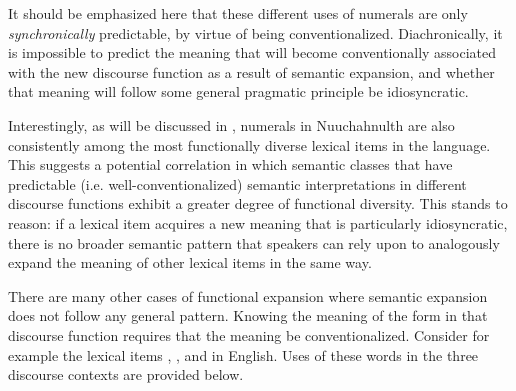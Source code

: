 It should be emphasized here that these different uses of numerals are only \emph{synchronically} predictable, by virtue of being conventionalized. Diachronically, it is impossible to predict the meaning that will become conventionally associated with the new discourse function as a result of semantic expansion, and whether that meaning will follow some general pragmatic principle be idiosyncratic.

Interestingly, as will be discussed in , numerals in Nuuchahnulth are also consistently among the most functionally diverse lexical items in the language. This suggests a potential correlation in which semantic classes that have predictable (i.e. well-conventionalized) semantic interpretations in different discourse functions exhibit a greater degree of functional diversity. This stands to reason: if a lexical item acquires a new meaning that is particularly idiosyncratic, there is no broader semantic pattern that speakers can rely upon to analogously expand the meaning of other lexical items in the same way.

There are many other cases of functional expansion where semantic expansion does not follow any general pattern. Knowing the meaning of the form in that discourse function requires that the meaning be conventionalized. Consider for example the lexical items , , and  in English. Uses of these words in the three discourse contexts are provided below.

